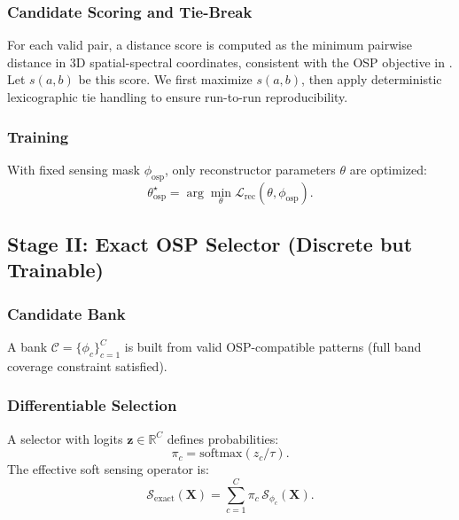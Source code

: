 \documentclass[journal]{IEEEtran}
\begin{document}
\subsubsection{Candidate Scoring and Tie-Break}
For each valid pair, a distance score is computed as the minimum pairwise distance in 3D spatial-spectral coordinates, consistent with the OSP objective in \cite{diaz2023osp}. Let $s(a,b)$ be this score. We first maximize $s(a,b)$, then apply deterministic lexicographic tie handling to ensure run-to-run reproducibility.

\subsubsection{Training}
With fixed sensing mask $\phi_{\mathrm{osp}}$, only reconstructor parameters $\theta$ are optimized:
\begin{equation}
\theta_{\mathrm{osp}}^{\star}
=
\arg\min_{\theta}\mathcal{L}_{\mathrm{rec}}(\theta,\phi_{\mathrm{osp}}).
\end{equation}

\subsection{Stage II: Exact OSP Selector (Discrete but Trainable)}
\subsubsection{Candidate Bank}
A bank $\mathcal{C}=\{\phi_c\}_{c=1}^{C}$ is built from valid OSP-compatible patterns (full band coverage constraint satisfied).

\subsubsection{Differentiable Selection}
A selector with logits $\mathbf{z}\in\mathbb{R}^{C}$ defines probabilities:
\begin{equation}
\pi_c=\mathrm{softmax}(z_c/\tau).
\end{equation}
The effective soft sensing operator is:
\begin{equation}
\mathcal{S}_{\mathrm{exact}}(\mathbf{X})
=
\sum_{c=1}^{C}\pi_c\,\mathcal{S}_{\phi_c}(\mathbf{X}).
\end{equation}
\end{document}
